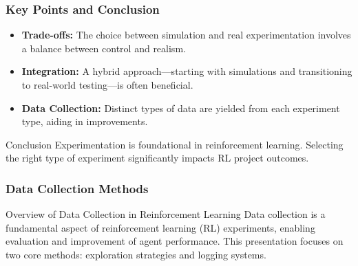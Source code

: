 \documentclass[aspectratio=169]{beamer}
\begin{document}
\begin{frame}
    \frametitle{Key Points and Conclusion}
    \begin{itemize}
        \item \textbf{Trade-offs:} The choice between simulation and real experimentation involves a balance between control and realism.
        \item \textbf{Integration:} A hybrid approach—starting with simulations and transitioning to real-world testing—is often beneficial.
        \item \textbf{Data Collection:} Distinct types of data are yielded from each experiment type, aiding in improvements.
    \end{itemize}
    \begin{block}{Conclusion}
        Experimentation is foundational in reinforcement learning. Selecting the right type of experiment significantly impacts RL project outcomes.
    \end{block}
\end{frame}

\begin{frame}[fragile]
    \frametitle{Data Collection Methods}
    \begin{block}{Overview of Data Collection in Reinforcement Learning}
        Data collection is a fundamental aspect of reinforcement learning (RL) experiments, enabling evaluation and improvement of agent performance. This presentation focuses on two core methods: exploration strategies and logging systems.
    \end{block}
\end{frame}
\end{document}
